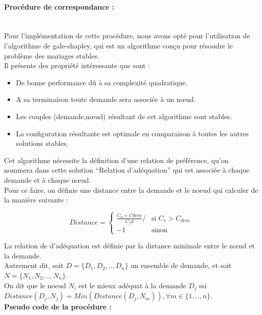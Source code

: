  \paragraph{Procédure de correspondance :}\\
 Pour l’implémentation de cette procédure, nous avons opté pour l’utilisation de l’algorithme de gale-shapley, qui est un algorithme conçu pour résoudre le problème des mariages stables.\\
Il présente des propriété intéressante que sont :
\begin{itemize}
    \item De bonne performance dû à sa complexité quadratique.
    \item A sa terminaison toute demande sera associée à un nœud.
    \item Les couples (demande,nœud) résultant de cet algorithme sont stables.
    \item La configuration résultante est optimale en comparaison à toutes les autres solutions stables.
\end{itemize}
Cet algorithme nécessite la définition d’une relation de préférence, qu’on nommera dans cette solution “Relation d’adéquation” qui est associée à chaque demande et à chaque nœud. \\
Pour ce faire, on définie une distance entre la demande et le noeud qui calculer de la manière suivante :
\begin{center}
    $$Distance =\left \lbrace 
    \begin{array}{ll}
        \frac{C_u + Cdem}{C_fd}/ & \mbox{si $C_r > C_{dem}$}\\
        -1 & \mbox{sinon}
    \end{array}
\right.$$
\end{center}
La relation de d’adéquation est définie par la distance minimale entre le nœud et la demande.\\
Autrement dit, soit $D=\{D_1,D_2,..,D_n\}$ un ensemble de demande, et soit $N=\{N_1,N_2,..,N_n\}$.\\
On dit que le noeud $N_i$ est le mieux adéquat à la demande $D_j$ ssi \\
$Distance(D_j,N_j) = Min (Distance(D_j,N_m)), \forall m \in \{1,..,n\}$.\\
\newpage
\textbf{Pseudo code de la procédure :}\\
